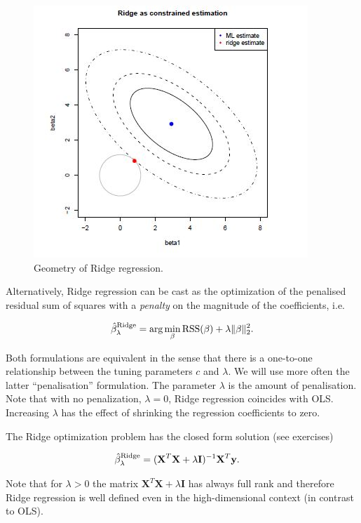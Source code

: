 \documentclass[
]{book}
\begin{document}
\begin{figure}

{\centering \includegraphics[width=0.7\linewidth]{ridge_geometry} 

}

\caption{Geometry of Ridge regression.}\label{fig:ridgegeom}
\end{figure}

Alternatively, Ridge regression can be cast as the optimization of the penalised residual sum of squares with a \emph{penalty} on the magnitude of the coefficients, i.e.~

\[\hat{\beta}^{\rm Ridge}_{\lambda}=\textrm{arg}\min\limits_{\beta}\textrm{RSS}(\beta)+\lambda\|\beta\|^2_2.\]

Both formulations are equivalent in the sense that there is a one-to-one relationship between the tuning parameters \(c\) and \(\lambda\). We will use more often the latter ``penalisation'' formulation. The parameter \(\lambda\) is the amount of penalisation. Note that with no penalization, \(\lambda=0\), Ridge regression coincides with OLS. Increasing \(\lambda\) has the effect of shrinking the regression coefficients to zero.

The Ridge optimization problem has the closed form solution (see exercises)

\begin{align*}
\hat{\beta}^{\rm Ridge}_{\lambda}&=(\textbf{X}^T \textbf{X}+\lambda \textbf{I})^{-1}\textbf{X}^T \textbf{y}.
\end{align*}

Note that for \(\lambda>0\) the matrix \(\textbf{X}^T \textbf{X}+\lambda \textbf{I}\) has always full rank and therefore Ridge regression is well defined even in the high-dimensional context (in contrast to OLS).
\end{document}
